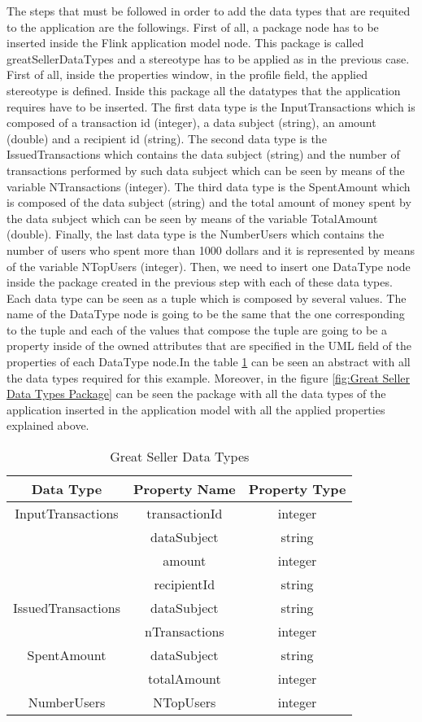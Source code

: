The steps that must be followed in order to add the data types that are requited to the application are the followings. First of all, a package node has to be inserted inside the Flink application model node. This package is called greatSellerDataTypes and a stereotype has to be applied as in the previous case. First of all, inside the properties window, in the profile field, the applied stereotype is defined. Inside this package all the datatypes that the application requires have to be inserted. The first data type is the InputTransactions which is composed of a transaction id (integer), a data subject (string), an amount (double) and a recipient id (string). The second data type is the IssuedTransactions which contains the data subject (string) and the number of transactions performed by such data subject which can be seen by means of the variable NTransactions (integer). The third data type is the SpentAmount which is composed of the data subject (string) and the total amount of money spent by the data subject which can be seen by means of the variable TotalAmount (double). Finally, the last data type is the NumberUsers which contains the number of users who spent more than 1000 dollars and it is represented by means of the variable NTopUsers (integer). Then, we need to insert one DataType node inside the package created in the previous step with each of these data types. Each data type can be seen as a tuple which is composed by several values. The name of the DataType node is going to be the same that the one corresponding to the tuple and each of the values that compose the tuple are going to be a property inside of the owned attributes that are specified in the UML field of the properties of each DataType node.In the table \ref{Great Seller Data Types} can be seen an abstract with all the data types required for this example. Moreover, in the figure \ref{fig:Great Seller Data Types Package} can be seen the package with all the data types of the application inserted in the application model with all the applied properties explained above.

\begin{table}[h!]
\centering
	\begin{tabular}{||c|c|c||} 
	\hline\hline
	Data Type & Property Name & Property Type \\ [1ex] 
	\hline\hline
	InputTransactions & transactionId & integer  \\
	& dataSubject & string  \\
	& amount & integer  \\
	& recipientId & string  \\
	\hline
	IssuedTransactions & dataSubject & string  \\
	& nTransactions & integer \\
	\hline
	SpentAmount & dataSubject & string  \\
	& totalAmount & integer \\
	\hline
	NumberUsers & NTopUsers & integer  \\
	\hline\hline
	\end{tabular}
\caption{Great Seller Data Types}
\label{Great Seller Data Types}
\end{table}

